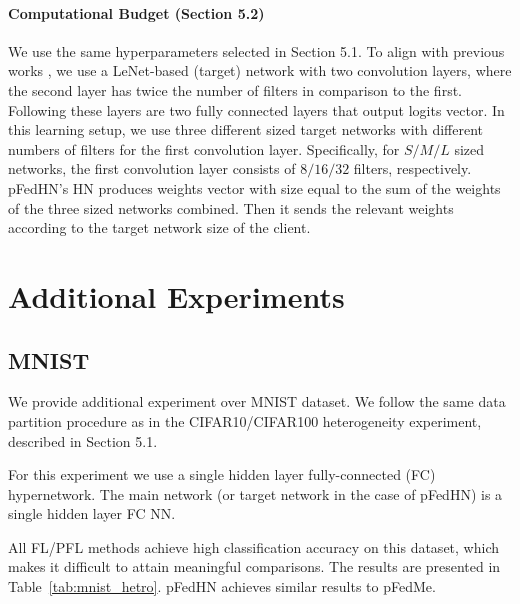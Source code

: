 \documentclass{article}
\newcommand\ourmethod{pFedHN}
\begin{document}
\paragraph{Computational Budget (Section 5.2)} We use the same hyperparameters selected in Section 5.1. To align with previous works \cite{Dinh2020PersonalizedFL, liang2020think, Fallah2020PersonalizedFL}, we use a LeNet-based (target) network with two convolution layers, where the second layer has twice the number of filters in comparison to the first. Following these layers are two fully connected layers that output logits vector. In this learning setup, we use three different sized target networks with different numbers of filters for the first convolution layer. Specifically, for $S/M/L$ sized networks, the first convolution layer consists of $8/16/32$ filters, respectively. \ourmethod{}'s HN produces weights vector with size equal to the sum of the weights of the three sized networks combined. Then it sends the relevant weights according to the target network size of the client.





\section{Additional Experiments}\label{app:additional_exp}

\subsection{MNIST} \label{app:mnist}

We provide additional experiment over MNIST dataset. We follow the same data partition procedure as in the CIFAR10/CIFAR100 heterogeneity experiment, described in Section 5.1.

For this experiment we use a single hidden layer fully-connected (FC) hypernetwork. The main network (or target network in the case of \ourmethod{}) is a single hidden layer FC NN.

All FL/PFL methods achieve high classification accuracy on this dataset, which makes it difficult to attain meaningful comparisons. The results are presented in Table~\ref{tab:mnist_hetro}. \ourmethod{} achieves similar results to pFedMe.
\end{document}
